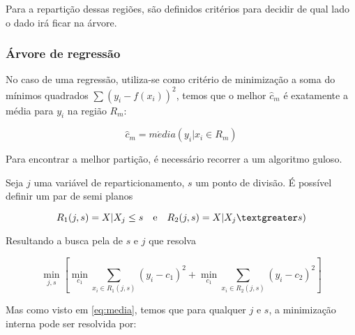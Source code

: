 Para a repartição dessas regiões, são definidos critérios para decidir de qual lado o dado irá ficar na árvore.


\subsubsection{Árvore de regressão}

No caso de uma regressão, utiliza-se como critério de minimização a soma do mínimos quadrados \begin{math}\sum{ (y_{i} - f(x_{i}))^{2}}\end{math}, temos que o melhor \begin{math}\hat c_{m}\end{math} é exatamente a média para \begin{math}y_{i}\end{math} na região \begin{math}R_{m}\end{math}:

\begin{equation}
\label{eq:media}
\hat c_{m} = m\acute edia(y_{i} | x_{i} \in R_{m})
\end{equation}

Para encontrar a melhor partição, é necessário recorrer a um algoritmo guloso.

Seja \begin{math}j\end{math} uma variável de reparticionamento, $s$ um ponto de divisão. É possível definir um par de semi planos 

\begin{equation}
R_{1}(j,s) = {X | X_{j}\leq s} \quad \textrm{e} \quad R_{2}(j,s) = {X | X_{j}\textgreater s})
\end{equation}

Resultando a busca pela de \begin{math}s\end{math} e \begin{math}j\end{math} que resolva

\begin{equation}
\min_{j,s} \left [ \min_{c_{1}} \sum_{x_{i} \in R_{1} (j,s)} (y_{i} - c_{1})^{2} + \min_{c_{1}} \sum_{x_{i} \in R_{2} (j,s)}(y_{i} - c_{2})^{2} \right ]
\end{equation} 


Mas como visto em \ref{eq:media}, temos que para qualquer $j$ e $s$, a minimização interna pode ser resolvida por:

